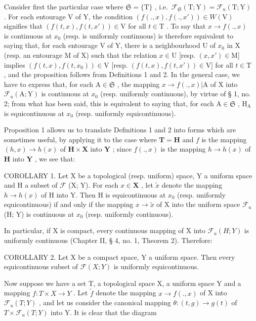 Consider first the particular case where \(\mathfrak{S} = \{\mathrm{T}\}\) , i.e.~\(\mathcal{F}_{\mathfrak{S}}(\mathrm{T};\mathrm{Y}) = \mathcal{F}_u(\mathrm{T};\mathrm{Y})\) . For each entourage V of Y, the condition \((f(.,x),f(.,x'))\in W(\mathrm{V})\) signifies that \((f(t,x),f(t,x'))\in \mathrm{V}\) for all \(t\in \mathrm{T}\) . To say that \(x\to f(.,x)\) is continuous at \(x_0\) (resp. is uniformly continuous) is therefore equivalent to saying that, for each entourage V of Y, there is a neighbourhood U of \(x_0\) in X (resp. an entourage M of X) such that the relation \(x\in \mathrm{U}\) {[}resp. \((x,x')\in \mathrm{M}]\) implies \((f(t,x),f(t,x_0))\in \mathrm{V}\) {[}resp. \((f(t,x),f(t,x'))\in \mathrm{V}]\) for all \(t\in \mathrm{T}\) , and the proposition follows from Definitions 1 and 2. In the general case, we have to express that, for each \(\mathrm{A}\in \mathfrak{S}\) , the mapping \(x\rightarrow f(.,x)|\mathrm{A}\) of X into \(\mathcal{F}_u(\mathrm{A};\mathrm{Y})\) is continuous at \(x_0\) (resp. uniformly continuous), by virtue of § 1, no. 2; from what has been said, this is equivalent to saying that, for each \(\mathrm{A}\in \mathfrak{S}\) , \(\mathrm{H}_{\mathrm{A}}\) is equicontinuous at \(x_0\) (resp. uniformly equicontinuous).

Proposition 1 allows us to translate Definitions 1 and 2 into forms which are sometimes useful, by applying it to the case where \(\mathbf{T} = \mathbf{H}\) and \(f\) is the mapping \((h, x) \to h(x)\) of \(\mathbf{H} \times \mathbf{X}\) into \(\mathbf{Y}\) ; since \(f(., x)\) is the mapping \(h \to h(x)\) of \(\mathbf{H}\) into \(\mathbf{Y}\) , we see that:

COROLLARY 1. Let X be a topological (resp. uniform) space, Y a uniform space and H a subset of \(\mathcal{F}\) (X; Y). For each \(x \in \mathbf{X}\) , let \(\tilde{x}\) denote the mapping \(h \to h(x)\) of H into Y. Then H is equicontinuous at \(x_0\) (resp. uniformly equicontinuous) if and only if the mapping \(x \to \tilde{x}\) of X into the uniform space \(\mathcal{F}_u\) (H; Y) is continuous at \(x_0\) (resp. uniformly continuous).

In particular, if X is compact, every continuous mapping of X into \(\mathcal{F}_{u}(H;Y)\) is uniformly continuous (Chapter II, § 4, no. 1, Theorem 2). Therefore:

COROLLARY 2. Let X be a compact space, Y a uniform space. Then every equicontinuous subset of \(\mathcal{F}(X;Y)\) is uniformly equicontinuous.

Now suppose we have a set T, a topological space X, a uniform space Y and a mapping \(f: T \times X \to Y\) . Let \(\tilde{f}\) denote the mapping \(x \to f(., x)\) of X into \(\mathcal{F}_{u}(T; Y)\) , and let us consider the canonical mapping \(\theta: (t, g) \to g(t)\) of \(T \times \mathcal{F}_{u}(T; Y)\) into Y. It is clear that the diagram

